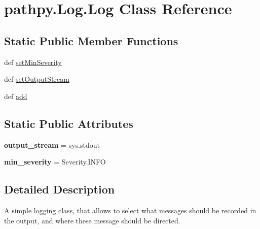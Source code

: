 \hypertarget{classpathpy_1_1Log_1_1Log}{\section{pathpy.\-Log.\-Log Class Reference}
\label{classpathpy_1_1Log_1_1Log}
}
\subsection*{Static Public Member Functions}
\begin{DoxyCompactItemize}
\item 
def \hyperlink{classpathpy_1_1Log_1_1Log_a9e0171144845116732949b87d348d27d}{set\-Min\-Severity}
\item 
def \hyperlink{classpathpy_1_1Log_1_1Log_a0e7ec3decada72adee6edcda4951e720}{set\-Output\-Stream}
\item 
def \hyperlink{classpathpy_1_1Log_1_1Log_a7b948e9bbdcd1ab31bf6ee1a425195f7}{add}
\end{DoxyCompactItemize}
\subsection*{Static Public Attributes}
\begin{DoxyCompactItemize}
\item 
\hypertarget{classpathpy_1_1Log_1_1Log_a8f7664b2a5379f9e94402117e22ed058}{{\bfseries output\-\_\-stream} = sys.\-stdout}\label{classpathpy_1_1Log_1_1Log_a8f7664b2a5379f9e94402117e22ed058}

\item 
\hypertarget{classpathpy_1_1Log_1_1Log_a327ac21443db1980997ddb0c8ef65313}{{\bfseries min\-\_\-severity} = Severity.\-I\-N\-F\-O}\label{classpathpy_1_1Log_1_1Log_a327ac21443db1980997ddb0c8ef65313}

\end{DoxyCompactItemize}


\subsection{Detailed Description}
\begin{DoxyVerb}A simple logging class, that allows to select what messages should 
    be recorded in the output, and where these message should be directed.
\end{DoxyVerb}
 


